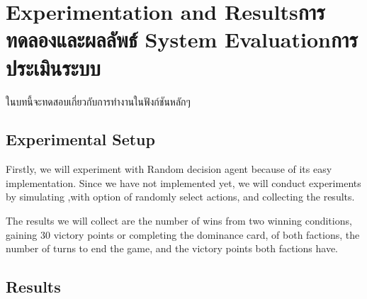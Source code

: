 \chapter{\ifproject%
\ifenglish Experimentation and Results\else การทดลองและผลลัพธ์\fi
\else%
\ifenglish System Evaluation\else การประเมินระบบ\fi
\fi}

ในบทนี้จะทดสอบเกี่ยวกับการทำงานในฟังก์ชันหลักๆ

\section{Experimental Setup}

Firstly, we will experiment with Random decision agent because of its easy implementation. Since we have not implemented \RootAI yet, we will conduct experiments by simulating \RootOurs,with option of randomly select actions, and collecting the results. 

The results we will collect are the number of wins from two winning conditions, gaining 30 victory points or completing the dominance card, of both factions, the number of turns to end the game, and the victory points both factions have.

\section{Results}